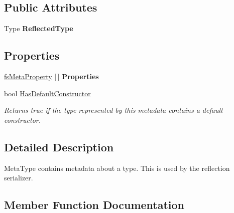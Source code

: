 \subsection*{Public Attributes}
\begin{DoxyCompactItemize}
\item 
\mbox{\label{class_full_serializer_1_1fs_meta_type_ac130218d2834637c5c542f367b60cb42}} 
Type {\bfseries Reflected\+Type}
\end{DoxyCompactItemize}
\subsection*{Properties}
\begin{DoxyCompactItemize}
\item 
\mbox{\label{class_full_serializer_1_1fs_meta_type_a313bb65ed53bfa38612dd1695365eebe}} 
\hyperlink{class_full_serializer_1_1_internal_1_1fs_meta_property}{fs\+Meta\+Property} \mbox{[}$\,$\mbox{]} {\bfseries Properties}
\item 
bool \hyperlink{class_full_serializer_1_1fs_meta_type_a52a664ae78a50823e1cca55d4a5cd12f}{Has\+Default\+Constructor}
\begin{DoxyCompactList}\small\item\em Returns true if the type represented by this metadata contains a default constructor. \end{DoxyCompactList}\end{DoxyCompactItemize}


\subsection{Detailed Description}
Meta\+Type contains metadata about a type. This is used by the reflection serializer. 



\subsection{Member Function Documentation}
\mbox{\label{class_full_serializer_1_1fs_meta_type_af2c4148ca9a3f9fe8d898e20035465b8}} 

